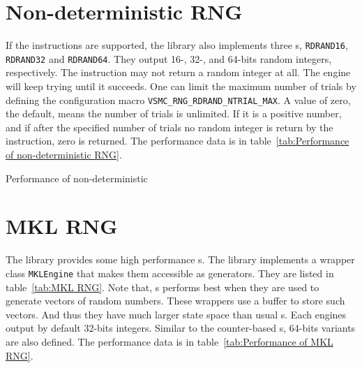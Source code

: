 \section{Non-deterministic RNG}
\label{sec:Non-deterministic RNG}

If the \rdrand instructions are supported, the library also implements three
\rng{}s, \verb|RDRAND16|, \verb|RDRAND32| and \verb|RDRAND64|. They output 16-,
32-, and 64-bits random integers, respectively. The \rdrand instruction may not
return a random integer at all. The \rng engine will keep trying until it
succeeds. One can limit the maximum number of trials by defining the
configuration macro \verb|VSMC_RNG_RDRAND_NTRIAL_MAX|. A value of zero, the
default, means the number of trials is unlimited. If it is a positive number,
and if after the specified number of trials no random integer is return by the
\rdrand instruction, zero is returned. The performance data is in
table~\ref{tab:Performance of non-deterministic RNG}.

\begin{table}
  \caption{Performance of non-deterministic \protect\rng}
  \label{tab:Performance of non-deterministic RNG}
\end{table}

\section{MKL RNG}
\label{sec:MKL RNG}

The \mkl library provides some high performance \rng{}s. The library implements
a wrapper class \verb|MKLEngine| that makes them accessible as \cppoo{}
generators. They are listed in table~\ref{tab:MKL RNG}. Note that, \mkl{}
\rng{}s performs best when they are used to generate vectors of random numbers.
These wrappers use a buffer to store such vectors. And thus they have much
larger state space than usual \rng{}s. Each \rng engines output by default
32-bits integers. Similar to the counter-based \rng{}s, 64-bits variants are
also defined. The performance data is in table~\ref{tab:Performance of MKL
  RNG}.


